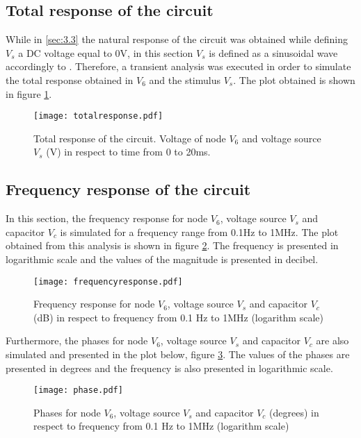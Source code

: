 \clearpage
\subsection{Total response of the circuit}
\label{sec:3.4}

While in \ref{sec:3.3} the natural response of the circuit was obtained while defining $V_s$ a DC voltage equal to 0V, in this section $V_s$ is defined as a sinusoidal wave accordingly to \label{fig:t2circuitNgSpice}.
Therefore, a transient analysis was executed in order to simulate the total response obtained in $V_6$ and the stimulus $V_s$. The plot obtained is shown in figure \ref{totalresponse}.

\begin{figure}[!htp] \centering
\texttt{[image: totalresponse.pdf]}
\captionsetup{justification=centering, margin=2cm}
\caption{Total response of the circuit. Voltage of node $V_6$ and voltage source $V_s$ (V) in respect to time from 0 to 20ms.}
\label{totalresponse}
\end{figure}
\FloatBarrier

\subsection{Frequency response of the circuit}
\label{sec:3.5}

In this section, the frequency response for node $V_6$, voltage source $V_s$ and capacitor $V_c$ is simulated for a frequency range from 0.1Hz to 1MHz. The plot obtained from this analysis is shown in figure \ref{frequencyresponse}. The frequency is presented in logarithmic scale and the values of the magnitude is presented in decibel. 

\begin{figure}[!htp] \centering
\texttt{[image: frequencyresponse.pdf]}
\captionsetup{justification=centering, margin=2cm}
\caption{Frequency response for node $V_6$, voltage source $V_s$ and capacitor $V_c$ (dB) in respect to frequency from 0.1 Hz to 1MHz (logarithm scale)}
\label{frequencyresponse}
\end{figure}
\FloatBarrier

Furthermore, the phases for node $V_6$, voltage source $V_s$ and capacitor $V_c$ are also simulated and presented in the plot below, figure \ref{phase}. The values of the phases are presented in degrees and the frequency is also presented in logarithmic scale.

\begin{figure}[!htp] \centering
\texttt{[image: phase.pdf]}
\captionsetup{justification=centering, margin=2cm}
\caption{Phases for node $V_6$, voltage source $V_s$ and capacitor $V_c$ (degrees) in respect to frequency from 0.1 Hz to 1MHz (logarithm scale)}
\label{phase}
\end{figure}
\FloatBarrier

